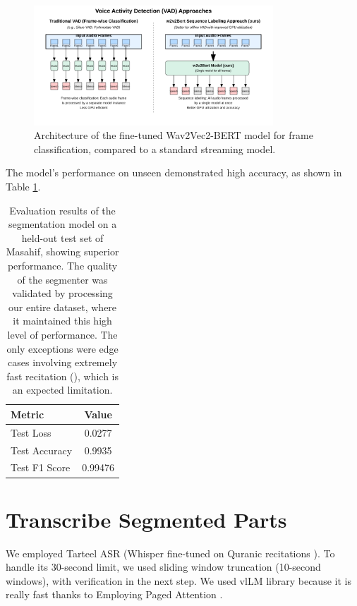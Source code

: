 \begin{figure}[H]
\centering
\includegraphics[width=0.8\textwidth]{../figures/vad-arch.png}
\caption{Architecture of the fine-tuned Wav2Vec2-BERT model for frame classification, compared to a standard streaming model.}
\label{fig:vad_arch}
\end{figure}

The model's performance on unseen  demonstrated high accuracy, as shown in Table \ref{tab:vad_results}.

\begin{longtable}{|l|c|}
\caption{Evaluation results of the segmentation model on a held-out test set of Masahif, showing superior performance. The quality of the segmenter was validated by processing our entire dataset, where it maintained this high level of performance. The only exceptions were edge cases involving extremely fast recitation (), which is an expected limitation.}
\label{tab:vad_results}\\
\hline
\textbf{Metric} & \textbf{Value} \\ 
\hline
\endfirsthead
\hline
Test Loss & 0.0277 \\
\hline
Test Accuracy & 0.9935 \\
\hline
Test F1 Score & 0.99476 \\
\hline
\end{longtable}







\section{Transcribe Segmented Parts}

We employed Tarteel ASR \cite{tarteel_whisper_ar_quran} (Whisper fine-tuned on Quranic recitations \cite{radford2023robust}). To handle its 30-second limit, we used sliding window truncation (10-second windows), with verification in the next step. We used vlLM library because it is really fast thanks to Employing Paged Attention \cite{kwon2023efficient}.





